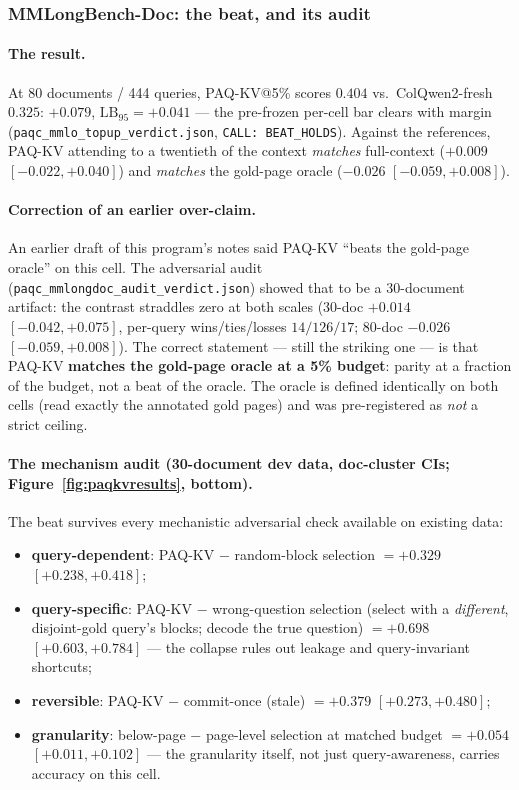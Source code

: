 \documentclass[11pt,letterpaper]{article}
\newcommand{\paqc}{\textsc{PAQ-KV}}
\newcommand{\lb}{\mathrm{LB}_{95}}
\begin{document}
\subsubsection{MMLongBench-Doc: the beat, and its audit}\label{sec:results-paqkv-mmlo}

\paragraph{The result.} At 80 documents / 444 queries, \paqc{}@5\% scores $0.404$ vs.\
ColQwen2-fresh $0.325$: $+0.079$, $\lb=+0.041$ --- the pre-frozen per-cell bar clears with
margin (\texttt{paqc\_mmlo\_topup\_verdict.json}, \texttt{CALL: BEAT\_HOLDS}). Against the
references, \paqc{} attending to a twentieth of the context \emph{matches} full-context
($+0.009$ $[-0.022,+0.040]$) and \emph{matches} the gold-page oracle ($-0.026$
$[-0.059,+0.008]$).

\paragraph{Correction of an earlier over-claim.} An earlier draft of this program's notes said
\paqc{} ``beats the gold-page oracle'' on this cell. The adversarial audit
(\texttt{paqc\_mmlongdoc\_audit\_verdict.json}) showed that to be a 30-document artifact: the
contrast straddles zero at both scales (30-doc $+0.014$ $[-0.042,+0.075]$, per-query
wins/ties/losses $14/126/17$; 80-doc $-0.026$ $[-0.059,+0.008]$). The correct statement ---
still the striking one --- is that \paqc{} \textbf{matches the gold-page oracle at a 5\%
budget}: parity at a fraction of the budget, not a beat of the oracle. The oracle is defined
identically on both cells (read exactly the annotated gold pages) and was pre-registered as
\emph{not} a strict ceiling.

\paragraph{The mechanism audit (30-document dev data, doc-cluster CIs;
Figure~\ref{fig:paqkvresults}, bottom).} The beat survives every mechanistic adversarial check
available on existing data:
\begin{itemize}
  \item \textbf{query-dependent}: \paqc{} $-$ random-block selection $= +0.329$
        $[+0.238,+0.418]$;
  \item \textbf{query-specific}: \paqc{} $-$ wrong-question selection (select with a
        \emph{different}, disjoint-gold query's blocks; decode the true question) $= +0.698$
        $[+0.603,+0.784]$ --- the collapse rules out leakage and query-invariant shortcuts;
  \item \textbf{reversible}: \paqc{} $-$ commit-once (stale) $= +0.379$ $[+0.273,+0.480]$;
  \item \textbf{granularity}: below-page $-$ page-level selection at matched budget $= +0.054$
        $[+0.011,+0.102]$ --- the granularity itself, not just query-awareness, carries
        accuracy on this cell.
\end{itemize}
\end{document}

